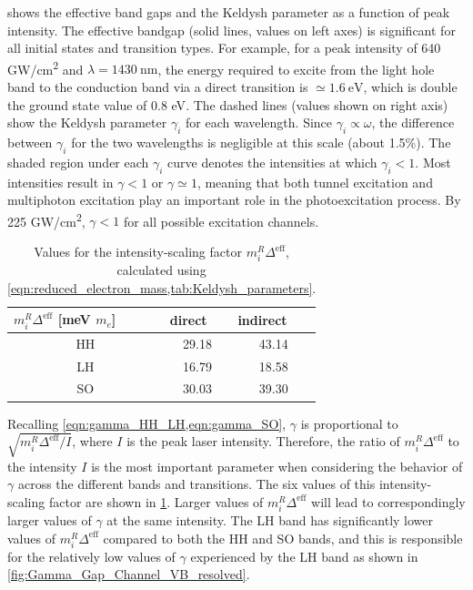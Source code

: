  shows the effective band gaps and the Keldysh parameter as a function of peak intensity. The effective bandgap (solid lines, values on left axes) is significant for all initial states and transition types. For example, for a peak intensity of 640 GW/cm\textsuperscript{2} and $\lambda = 1430 \ \textrm{nm}$, the energy required to excite from the light hole band to the conduction band via a direct transition is $\simeq 1.6 \ \textrm{eV}$, which is double the ground state value of {0.8 eV}. The dashed lines (values shown on right axis) show the Keldysh parameter $\gamma_i$ for each wavelength. Since $\gamma_i \propto \omega$, the difference between $\gamma_i$ for the two wavelengths is negligible at this scale (about 1.5\%). The shaded region under each $\gamma_i$ curve denotes the intensities at which $\gamma_i<1$. Most intensities result in $\gamma < 1$ or $\gamma \simeq 1$, meaning that both tunnel excitation and multiphoton excitation play an important role in the photoexcitation process. By 225 GW/cm\textsuperscript{2}, $\gamma < 1$ for all possible excitation channels.

\begin{table}[]
	\centering
	\begin{tabular}{c|c|c}
		\multicolumn{1}{l|}{$m_i^R \Delta^{\textrm{eff}}$ [meV $m_e$]} & \multicolumn{1}{l|}{direct} & \multicolumn{1}{l}{indirect} \\ \hline
		HH & 29.18 & 43.14 \\
		LH & 16.79 & 18.58 \\
		SO & 30.03 & 39.30
	\end{tabular}
	\caption{Values for the intensity-scaling factor $m_i^R \Delta^{\textrm{eff}}$, calculated using \cref{eqn:reduced_electron_mass,tab:Keldysh_parameters}.}
	\label{tab:gamma_factor}
\end{table}

Recalling \cref{eqn:gamma_HH_LH,eqn:gamma_SO}, $\gamma$ is proportional to $\sqrt{m_i^R \Delta^{\textrm{eff}} / I}$, where $I$ is the peak laser intensity. Therefore, the ratio of $m_i^R \Delta^{\textrm{eff}}$ to the intensity $I$ is the most important parameter when considering the behavior of $\gamma$ across the different bands and transitions. The six values of this intensity-scaling factor are shown in \cref{tab:gamma_factor}. Larger values of $m_i^R \Delta^{\textrm{eff}}$ will lead to correspondingly larger values of $\gamma$ at the same intensity. The LH band has significantly lower values of $m_i^R \Delta^{\textrm{eff}}$ compared to both the HH and SO bands, and this is responsible for the relatively low values of $\gamma$ experienced by the LH band as shown in \cref{fig:Gamma_Gap_Channel_VB_resolved}.

